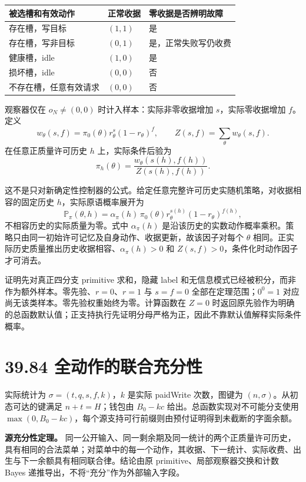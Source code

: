 \documentclass[
  11pt,
  oneside]{book}
\newcounter{none} %
\begin{document}
{\def\LTcaptype{none} %
\begin{longtable}[]{@{}lll@{}}
\toprule\noalign{}
被选槽和有效动作 & 正常收据 & 零收据是否辨明故障 \\
\midrule\noalign{}
\endhead
\bottomrule\noalign{}
\endlastfoot
存在槽，写目标 & \((1,1)\) & 是 \\
存在槽，写非目标 & \((0,1)\) & 是，正常失败写仍收费 \\
健康槽，idle & \((1,0)\) & 是 \\
损坏槽，idle & \((0,0)\) & 否 \\
不存在槽，任意有效请求 & \((0,0)\) & 否 \\
\end{longtable}
}

观察器仅在 \(o_N\ne(0,0)\) 时计入样本：实际非零收据增加 \(s\)，实际零收据增加 \(f\)。定义 \[w_\theta(s,f)=\pi_0(\theta)r_\theta^s(1-r_\theta)^f,\qquad Z(s,f)=\sum_\theta w_\theta(s,f).\] 在任意正质量许可历史 \(h\) 上，实际条件后验为 \[\boxed{\displaystyle\pi_h(\theta)=\frac{w_\theta(s(h),f(h))}{Z(s(h),f(h))}.}\]

这不是只对新确定性控制器的公式。给定任意完整许可历史实随机策略，对收据相容的固定历史 \(h\)，实际原语概率展开为 \[\mathbb P_\pi(\theta,h)=\alpha_\pi(h)\,\pi_0(\theta)r_\theta^{s(h)}(1-r_\theta)^{f(h)},\] 不相容历史的实际质量为零。式中 \(\alpha_\pi(h)\) 是沿该历史的实数动作概率乘积。策略只由同一初始许可记忆及自身动作、收据更新，故该因子对每个 \(\theta\) 相同。正实际历史质量推出历史收据相容、\(\alpha_\pi(h)>0\) 和 \(Z(s,f)>0\)，条件化时动作因子才可消去。

证明先对真正四分支 primitive 求和，隐藏 label 和无信息模式已经被积分，而非作为额外样本。零先验、\(r=0\)、\(r=1\) 与 \(s=f=0\) 全部在定理范围；\(0^0=1\) 对应尚无该类样本。零先验权重始终为零。计算函数在 \(Z=0\) 时返回原先验作为明确的总函数默认值；正支持执行先证明分母严格为正，因此不靠默认值解释实际条件概率。

\section{39.84 全动作的联合充分性}\label{ux5168ux52a8ux4f5cux7684ux8054ux5408ux5145ux5206ux6027}

实际统计为 \(\sigma=(t,q,s,f,k)\)，\(k\) 是实际 paidWrite 次数，图键为 \((n,\sigma)\)。从初态可达的键满足 \(n+t=H\)；钱包由 \(B_0-kc\) 给出。总函数实现对不可能分支使用 \(\max(0,B_0-kc)\)，每个源支持可行前缀则由预付证明得到未截断的字面余额。

\textbf{源充分性定理。} 同一公开输入、同一剩余期及同一统计的两个正质量许可历史，具有相同的合法菜单；对菜单中的每一个动作，其收据、下一统计、实际收费、出生与下一余额具有相同联合律。结论由原 primitive、局部观察器交换和计数 Bayes 递推导出，不将``充分''作为外部输入字段。
\end{document}
